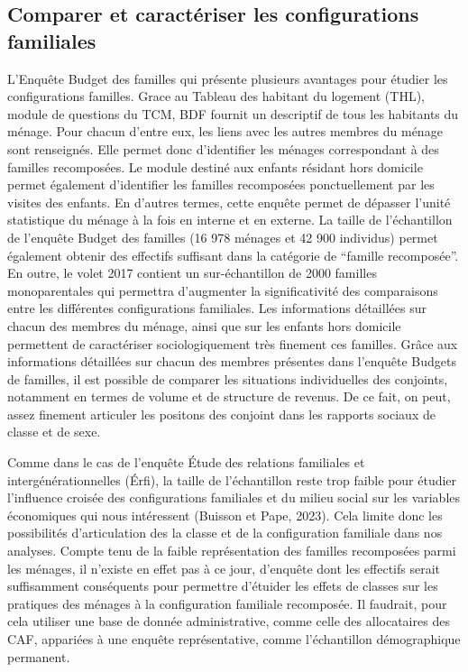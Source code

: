 \documentclass[
  12pt,
]{book}
\begin{document}
\subsection{Comparer et caractériser les configurations
familiales}\label{comparer-et-caractuxe9riser-les-configurations-familiales}

L'Enquête Budget des familles qui présente plusieurs avantages pour
étudier les configurations familles. Grace au Tableau des habitant du
logement (THL), module de questions du TCM, BDF fournit un descriptif de
tous les habitants du ménage. Pour chacun d'entre eux, les liens avec
les autres membres du ménage sont renseignés. Elle permet donc
d'identifier les ménages correspondant à des familles recomposées. Le
module destiné aux enfants résidant hors domicile permet également
d'identifier les familles recomposées ponctuellement par les visites des
enfants. En d'autres termes, cette enquête permet de dépasser l'unité
statistique du ménage à la fois en interne et en externe. La taille de
l'échantillon de l'enquête Budget des familles (16 978 ménages et 42 900
individus) permet également obtenir des effectifs suffisant dans la
catégorie de ``famille recomposée''. En outre, le volet 2017 contient un
sur-échantillon de 2000 familles monoparentales qui permettra
d'augmenter la significativité des comparaisons entre les différentes
configurations familiales. Les informations détaillées sur chacun des
membres du ménage, ainsi que sur les enfants hors domicile permettent de
caractériser sociologiquement très finement ces familles. Grâce aux
informations détaillées sur chacun des membres présentes dans l'enquête
Budgets de familles, il est possible de comparer les situations
individuelles des conjoints, notamment en termes de volume et de
structure de revenus. De ce fait, on peut, assez finement articuler les
positons des conjoint dans les rapports sociaux de classe et de sexe.

Comme dans le cas de l'enquête Étude des relations familiales et
intergénérationnelles (Érfi), la taille de l'échantillon reste trop
faible pour étudier l'influence croisée des configurations familiales et
du milieu social sur les variables économiques qui nous intéressent
(Buisson et Pape, 2023). Cela limite donc les possibilités
d'articulation des la classe et de la configuration familiale dans nos
analyses. Compte tenu de la faible représentation des familles
recomposées parmi les ménages, il n'existe en effet pas à ce jour,
d'enquête dont les effectifs serait suffisamment conséquents pour
permettre d'étuider les effets de classes sur les pratiques des ménages
à la configuration familiale recomposée. Il faudrait, pour cela utiliser
une base de donnée administrative, comme celle des allocataires des CAF,
appariées à une enquête représentative, comme l'échantillon
démographique permanent.
\end{document}
